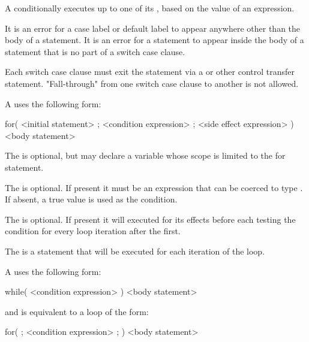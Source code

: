 A  conditionally executes up to one of its , based on the value of an expression.

It is an error for a case label or default label to appear anywhere other than the body of a  statement.
It is an error for a statement to appear inside the body of a  statement that is no part of a switch case clause.

Each switch case clause must exit the  statement via a  or other control transfer statement.
"Fall-through" from one switch case clause to another is not allowed.



A  uses the following form:

\begin{codeblock}
for( <initial statement> ; <condition expression> ; <side effect expression> ) <body statement>
\end{codeblock}

The  is optional, but may declare a variable whose scope is limited to the for statement.

The  is optional. If present it must be an expression that can be coerced to type . If absent, a true value is used as the condition.

The  is optional. If present it will executed for its effects before each testing the condition for every loop iteration after the first.

The  is a statement that will be executed for each iteration of the loop.


A  uses the following form:

\begin{codeblock}
while( <condition expression> ) <body statement>
\end{codeblock}

and is equivalent to a  loop of the form:

\begin{codeblock}
for( ; <condition expression> ; ) <body statement>
\end{codeblock}


